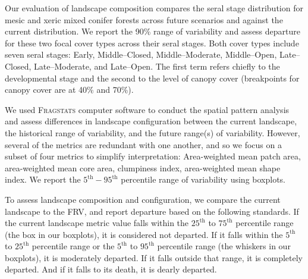 Our evaluation of landscape composition compares the seral stage distribution for mesic and xeric mixed conifer forests across future scenarios and against the current distribution. We report the 90\% range of variability and assess departure for these two focal cover types across their seral stages. Both cover types include seven seral stages: Early, Middle--Closed, Middle--Moderate, Middle--Open, Late--Closed, Late--Moderate, and Late--Open. The first term refers chiefly to the developmental stage and the second to the level of canopy cover (breakpoints for canopy cover are at 40\% and 70\%).


%
We used \textsc{Fragstats} computer software \citep{Fragstats2012} to conduct the spatial pattern analysis and assess differences in landscape configuration between the current landscape, the historical range of variability, and the future range(s) of variability. However, several of the metrics are redundant with one another, and so we focus on a subset of four metrics to simplify interpretation: Area-weighted mean patch area, area-weighted mean core area, clumpiness index, area-weighted mean shape index. We report the $5^{\text{th}}-95^{\text{th}}$ percentile range of variability using boxplots. %

To assess landscape composition and configuration, we compare the current landscape to the FRV, and report departure based on the following standards. If the current landscape metric value falls within the $25^{\text{th}}$ to $75^{\text{th}}$ percentile range (the box in our boxplots), it is considered not departed. If it falls within the $5^{\text{th}}$ to $25^{\text{th}}$ percentile range or the $5^{\text{th}}$ to $95^{\text{th}}$ percentile range (the whiskers in our boxplots), it is moderately departed. If it falls outside that range, it is completely departed. And if it falls to its death, it is dearly departed.



